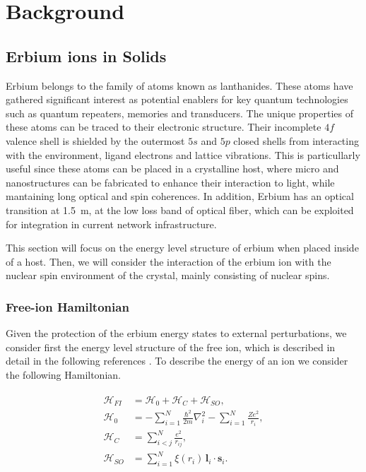 \chapter{Background}

\section{Erbium ions in Solids}

Erbium belongs to the family of atoms known as lanthanides. These atoms have gathered significant interest as potential enablers for key quantum technologies such as quantum repeaters, memories and transducers. The unique properties of these atoms can be traced to their electronic structure. Their incomplete $4f$ valence shell is shielded by the outermost $5s$ and $5p$ closed shells from interacting with the environment, ligand electrons and lattice vibrations. This is particullarly useful since these atoms can be placed in a crystalline host, where micro and nanostructures can be fabricated to enhance their interaction to light, while mantaining long optical and spin coherences. In addition, Erbium has an optical transition at 1.5~\textmu m, at the low loss band of optical fiber, which can be exploited for integration in current network infrastructure. 

This section will focus on the energy level structure of erbium when placed inside of a \Ca host. Then, we will consider the interaction of the erbium ion with the nuclear spin environment of the crystal, mainly consisting of \W nuclear spins. 

\subsection{Free-ion Hamiltonian}

Given the protection of the erbium energy states to external perturbations, we consider first the energy level structure of the free \Er ion, which is described in detail in the following references \cite{weissbluth_atoms_2012, abragam_electron_2012}. To describe the energy of an ion we consider the following Hamiltonian.

\begin{align}
\begin{split}
\mathcal{H}_{FI} &= \mathcal{H}_0 + \mathcal{H}_C + \mathcal{H}_{SO}, \\
\mathcal{H}_0 &= - \sum_{i=1}^N \frac{\hbar^2}{2m} \nabla_i^2 
- \sum_{i=1}^N \frac{Ze^2}{r_i}, \\
\mathcal{H}_C &= \sum_{i<j}^N \frac{e^2}{r_{ij}}, \\
\mathcal{H}_{SO} &= \sum_{i=1}^N \xi(r_i)\,\mathbf{l}_i \cdot \mathbf{s}_i.
\end{split}
\end{align}

